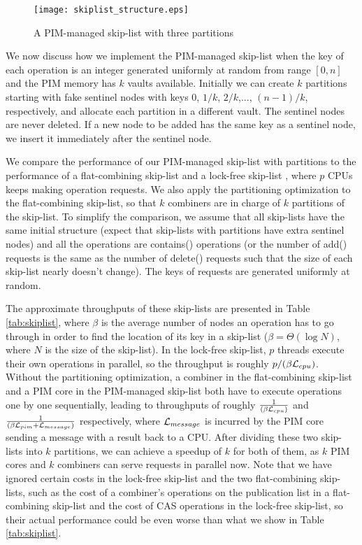 \begin{figure}[ht!]
\centering
\texttt{[image: skiplist\_structure.eps]}
\caption{A PIM-managed skip-list with three partitions}
\label{figure:skiplist_structure}
\end{figure}

We now discuss how we implement the PIM-managed skip-list
when the key of each operation is an integer generated uniformly at random
from range $[0, n]$ and the PIM memory has $k$ vaults available.
Initially we can create $k$ partitions starting with fake sentinel nodes
with keys $0$, $1/k$, $2/k$,..., $(n-1)/k$, respectively, 
and allocate each partition in a different vault. 
The sentinel nodes are never deleted.
If a new node to be added has the same key as a sentinel node,
we insert it immediately after the sentinel node.

We compare the performance of our PIM-managed skip-list with partitions 
to the performance of a flat-combining skip-list \cite{Hendler10}
and a lock-free skip-list \cite{Herlihy08}, 
where $p$ CPUs keeps making operation requests.
We also apply the partitioning optimization to the flat-combining skip-list, 
so that $k$ combiners are in charge of $k$ partitions of the skip-list. 
To simplify the comparison, we assume that all skip-lists have the same
initial structure (expect that skip-lists with partitions have extra sentinel nodes)
and all the operations are contains() operations
(or the number of add() requests is the same as the number of delete() requests 
such that the size of each skip-list nearly doesn't change).
The keys of requests are generated uniformly at random. 

The approximate throughputs of these skip-lists are presented in Table \ref{tab:skiplist}, 
where $\beta$ is the average number of nodes an operation has to go through
in order to find the location of its key in a skip-list
($\beta = \Theta(\log N)$, where $N$ is the size of the skip-list).
In the lock-free skip-list, $p$ threads execute their own operations in parallel, 
so the throughput is roughly $p/(\beta\mathcal{L}_{cpu})$. 
Without the partitioning optimization, a combiner in the flat-combining skip-list and a PIM core 
in the PIM-managed skip-list both have to execute operations one by one sequentially, 
leading to throughputs of roughly ${1 \over (\beta\mathcal{L}_{cpu})}$ and ${1 \over (\beta\mathcal{L}_{pim} + \mathcal{L}_{message})}$ respectively, 
where $\mathcal{L}_{message}$ is incurred by the PIM core sending a message with a result back to a CPU. 
After dividing these two skip-lists into $k$ partitions, we can achieve a speedup of $k$ for both of them, 
as $k$ PIM cores and $k$ combiners can serve requests in parallel now. 
Note that we have ignored certain costs in the lock-free skip-list and the two flat-combining skip-lists, 
such as the cost of a combiner's operations on the publication list in a flat-combining skip-list
and the cost of CAS operations in the lock-free skip-list, 
so their actual performance could be even worse than what we show in Table \ref{tab:skiplist}.  

